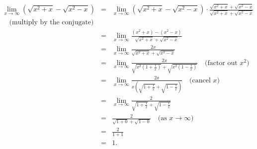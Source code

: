 \documentclass{article}
\begin{document}
\subsection{}
\[
\begin{array}{rcl}
	\lim_{x \to \infty} \left(\sqrt{x^2+x} - \sqrt{x^2-x} \right) 
	& = & \lim_{x \to \infty} \left(\sqrt{x^2+x} - \sqrt{x^2-x} \right) \cdot \frac{\sqrt{x^2+x} + \sqrt{x^2-x}}{\sqrt{x^2+x} + \sqrt{x^2-x}} 
	 \\ \quad \text{(multiply by the conjugate)} \\
	& = & \lim_{x \to \infty} \frac{(x^2+x) - (x^2-x)}{\sqrt{x^2+x} + \sqrt{x^2-x}} \\
	& = & \lim_{x \to \infty} \frac{2x}{\sqrt{x^2+x} + \sqrt{x^2-x}} \\
	& = & \lim_{x \to \infty} \frac{2x}{\sqrt{x^2(1+\frac{1}{x})} + \sqrt{x^2(1-\frac{1}{x})}} \quad \text{(factor out } x^2\text{)} \\
	& = & \lim_{x \to \infty} \frac{2x}{x\left(\sqrt{1+\frac{1}{x}} + \sqrt{1-\frac{1}{x}}\right)} \quad \text{(cancel } x\text{)} \\
	& = & \lim_{x \to \infty} \frac{2}{\sqrt{1+\frac{1}{x}} + \sqrt{1-\frac{1}{x}}} \\
	& = & \frac{2}{\sqrt{1+0} + \sqrt{1-0}} \quad \text{(as } x \to \infty\text{)} \\
	& = & \frac{2}{1 + 1} \\
	& = & 1.
\end{array}
\]
\end{document}
